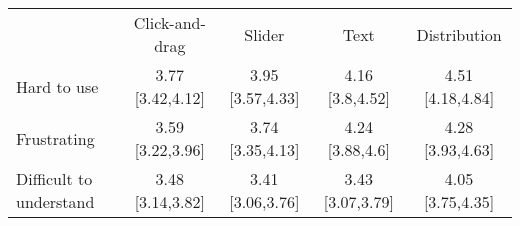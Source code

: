 
\begin{tabular}[t]{lcccc}
\toprule
\multicolumn{1}{c}{ } & \multicolumn{1}{c}{Click-and-drag} & \multicolumn{1}{c}{Slider} & \multicolumn{1}{c}{Text} & \multicolumn{1}{c}{Distribution} \\
\cmidrule(l{3pt}r{3pt}){2-2} \cmidrule(l{3pt}r{3pt}){3-3} \cmidrule(l{3pt}r{3pt}){4-4} \cmidrule(l{3pt}r{3pt}){5-5}
Hard to use & 3.77 [3.42,4.12] & 3.95 [3.57,4.33] & 4.16 [3.8,4.52] & 4.51 [4.18,4.84]\\
Frustrating & 3.59 [3.22,3.96] & 3.74 [3.35,4.13] & 4.24 [3.88,4.6] & 4.28 [3.93,4.63]\\
Difficult to understand & 3.48 [3.14,3.82] & 3.41 [3.06,3.76] & 3.43 [3.07,3.79] & 4.05 [3.75,4.35]\\
\bottomrule
\end{tabular}
